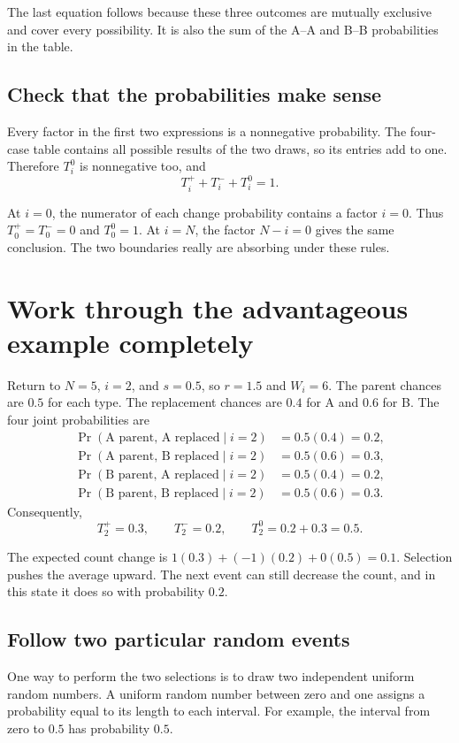 The last equation follows because these three outcomes are mutually exclusive
and cover every possibility. It is also the sum of the A--A and B--B
probabilities in the table.

\subsection{Check that the probabilities make sense}

Every factor in the first two expressions is a nonnegative probability.
The four-case table contains all possible results of the two draws, so its
entries add to one. Therefore \(T_i^0\) is nonnegative too, and
\[
  T_i^++T_i^-+T_i^0=1.
\]

At \(i=0\), the numerator of each change probability contains a factor
\(i=0\). Thus \(T_0^+=T_0^-=0\) and \(T_0^0=1\). At \(i=N\), the
factor \(N-i=0\) gives the same conclusion. The two boundaries really are
absorbing under these rules.

\section{Work through the advantageous example completely}

Return to \(N=5\), \(i=2\), and \(s=0.5\), so \(r=1.5\) and \(W_i=6\).
The parent chances are \(0.5\) for each type. The replacement chances are
\(0.4\) for A and \(0.6\) for B. The four joint probabilities are
\begin{align*}
 \Pr(\text{A parent, A replaced}\mid i=2)&=0.5(0.4)=0.2,\\
 \Pr(\text{A parent, B replaced}\mid i=2)&=0.5(0.6)=0.3,\\
 \Pr(\text{B parent, A replaced}\mid i=2)&=0.5(0.4)=0.2,\\
 \Pr(\text{B parent, B replaced}\mid i=2)&=0.5(0.6)=0.3.
\end{align*}
Consequently,
\[
  T_2^+=0.3,\qquad T_2^-=0.2,\qquad T_2^0=0.2+0.3=0.5.
\]

The expected count change is \(1(0.3)+(-1)(0.2)+0(0.5)=0.1\). Selection
pushes the average upward. The next event can still decrease the count,
and in this state it does so with probability \(0.2\).

\subsection{Follow two particular random events}

One way to perform the two selections is to draw two independent uniform
random numbers. A uniform random number between zero and one assigns a
probability equal to its length to each interval. For example, the interval
from zero to \(0.5\) has probability \(0.5\).

